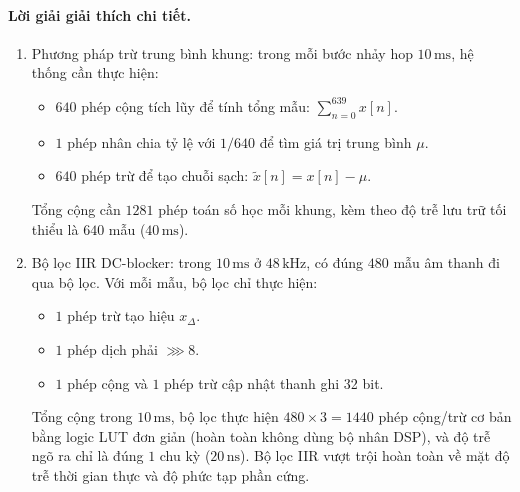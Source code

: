 \paragraph{Lời giải giải thích chi tiết.}
\begin{enumerate}[label=\alph*)]
    \item Phương pháp trừ trung bình khung: trong mỗi bước nhảy hop $10\,\text{ms}$, hệ thống cần thực hiện:
    \begin{itemize}
        \item $640$ phép cộng tích lũy để tính tổng mẫu: $\sum_{n=0}^{639} x[n]$.
        \item $1$ phép nhân chia tỷ lệ với $1/640$ để tìm giá trị trung bình $\mu$.
        \item $640$ phép trừ để tạo chuỗi sạch: $\tilde{x}[n] = x[n] - \mu$.
    \end{itemize}
    Tổng cộng cần $1281$ phép toán số học mỗi khung, kèm theo độ trễ lưu trữ tối thiểu là $640$ mẫu ($40\,\text{ms}$).
    \item Bộ lọc IIR DC-blocker: trong $10\,\text{ms}$ ở $48\,\text{kHz}$, có đúng $480$ mẫu âm thanh đi qua bộ lọc. Với mỗi mẫu, bộ lọc chỉ thực hiện:
    \begin{itemize}
        \item $1$ phép trừ tạo hiệu $x_{\Delta}$.
        \item $1$ phép dịch phải $\ggg 8$.
        \item $1$ phép cộng và $1$ phép trừ cập nhật thanh ghi 32 bit.
    \end{itemize}
    Tổng cộng trong $10\,\text{ms}$, bộ lọc thực hiện $480 \times 3 = 1440$ phép cộng/trừ cơ bản bằng logic LUT đơn giản (hoàn toàn không dùng bộ nhân DSP), và độ trễ ngõ ra chỉ là đúng $1$ chu kỳ ($20\,\text{ns}$). Bộ lọc IIR vượt trội hoàn toàn về mặt độ trễ thời gian thực và độ phức tạp phần cứng.
\end{enumerate}
